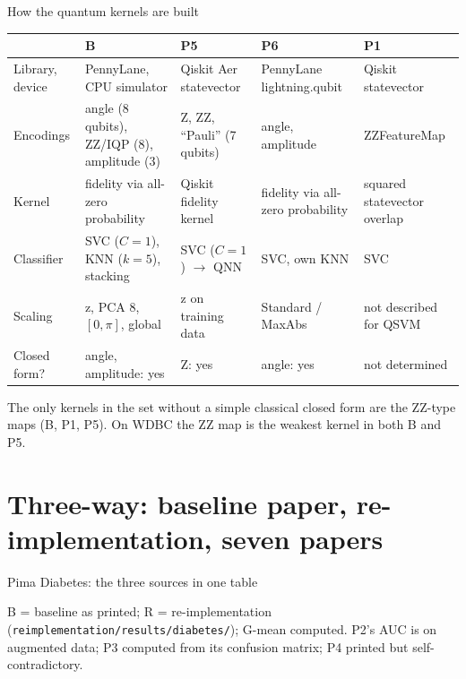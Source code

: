 \documentclass[aspectratio=169,10pt,t,xcolor={table}]{beamer}
\newcommand{\tabdir}{../reimplementation/tex/papers/}
\begin{document}
\begin{frame}{How the quantum kernels are built}
\centering\scriptsize
\begin{tabularx}{\textwidth}{l Y Y Y Y}
\toprule
 & B & P5 & P6 & P1 \\
\midrule
Library, device & PennyLane, CPU simulator & Qiskit Aer statevector & PennyLane lightning.qubit & Qiskit statevector \\
Encodings & angle (8 qubits), ZZ/IQP (8), amplitude (3) & Z, ZZ, ``Pauli'' (7 qubits) & angle, amplitude & ZZFeatureMap \\
Kernel & fidelity via all-zero probability & Qiskit fidelity kernel & fidelity via all-zero probability & squared statevector overlap \\
Classifier & SVC ($C{=}1$), KNN ($k{=}5$), stacking & SVC ($C{=}1$) $\to$ QNN & SVC, own KNN & SVC \\
Scaling & z, PCA 8, $[0,\pi]$, \textcolor{qred}{global} & z on training data & Standard / MaxAbs & not described for QSVM \\
Closed form? & angle, amplitude: yes & Z: yes & angle: yes & not determined \\
\bottomrule
\end{tabularx}
\par\medskip\raggedright\footnotesize
The only kernels in the set without a simple classical closed form are the ZZ-type maps (B, P1, P5). On WDBC the ZZ map is the weakest kernel in both B and P5.
\end{frame}

\section{Three-way: baseline paper, re-implementation, seven papers}
\begin{frame}{Pima Diabetes: the three sources in one table}
\centering
\begin{adjustbox}{max width=\textwidth, max totalheight=0.74\textheight}

\end{adjustbox}
\par\smallskip\raggedright\scriptsize
B = baseline as printed; R = re-implementation (\texttt{reimplementation/results/diabetes/}); G-mean computed. P2's AUC is on augmented data; P3 computed from its confusion matrix; P4 printed but self-contradictory.
\end{frame}
\end{document}
